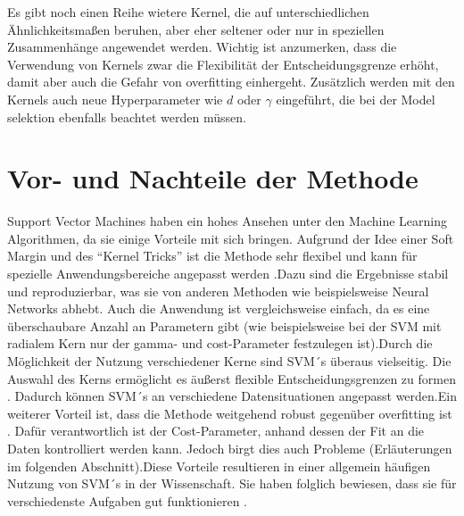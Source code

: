 \documentclass[
]{article}
\begin{document}
Es gibt noch einen Reihe wietere Kernel, die auf unterschiedlichen
Ähnlichkeitsmaßen beruhen, aber eher seltener oder nur in speziellen
Zusammenhänge angewendet werden. Wichtig ist anzumerken, dass die
Verwendung von Kernels zwar die Flexibilität der Entscheidungsgrenze
erhöht, damit aber auch die Gefahr von overfitting einhergeht.
Zusätzlich werden mit den Kernels auch neue Hyperparameter wie \(d\)
oder \(\gamma\) eingeführt, die bei der Model selektion ebenfalls
beachtet werden müssen.\\

\section{Vor- und Nachteile der Methode}

Support Vector Machines haben ein hohes Ansehen unter den Machine
Learning Algorithmen, da sie einige Vorteile mit sich bringen. Aufgrund
der Idee einer Soft Margin und des ``Kernel Tricks'' ist die Methode
sehr flexibel und kann für spezielle Anwendungsbereiche angepasst werden
\parencite{bennettSupportVectorMachines2000}.Dazu sind die Ergebnisse
stabil und reproduzierbar, was sie von anderen Methoden wie
beispielsweise Neural Networks abhebt. Auch die Anwendung ist
vergleichsweise einfach, da es eine überschaubare Anzahl an Parametern
gibt (wie beispielsweise bei der SVM mit radialem Kern nur der gamma-
und cost-Parameter festzulegen ist).\newline Durch die Möglichkeit der
Nutzung verschiedener Kerne sind SVM´s überaus vielseitig. Die Auswahl
des Kerns ermöglicht es äußerst flexible Entscheidungsgrenzen zu formen
\parencite{kuhnAppliedPredictiveModeling2013}. Dadurch können SVM´s an
verschiedene Datensituationen angepasst werden.\newline Ein weiterer
Vorteil ist, dass die Methode weitgehend robust gegenüber overfitting
ist \parencite{kuhnAppliedPredictiveModeling2013}. Dafür verantwortlich
ist der Cost-Parameter, anhand dessen der Fit an die Daten kontrolliert
werden kann. Jedoch birgt dies auch Probleme (Erläuterungen im folgenden
Abschnitt).\newline Diese Vorteile resultieren in einer allgemein
häufigen Nutzung von SVM´s in der Wissenschaft. Sie haben folglich
bewiesen, dass sie für verschiedenste Aufgaben gut funktionieren
\parencite{kuhnAppliedPredictiveModeling2013}.
\end{document}
